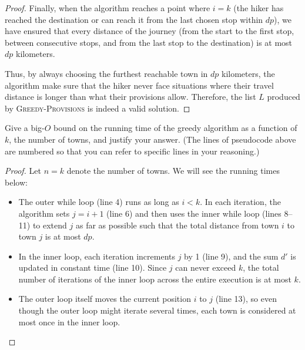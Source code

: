 \documentclass[11pt,fleqn]{exam}
\newenvironment{soln}{\color{solnblue}}{}
\newif\ifsolutions\solutionsfalse
\begin{document}
\begin{questions}
\begin{soln}
\begin{proof}
   Finally, when the algorithm reaches a point where \( i = k \) (the hiker has reached the destination 
   or can reach it from the last chosen stop within \( dp \)), we have ensured that every distance of the journey 
   (from the start to the first stop, between consecutive stops, and from the last stop to the destination) 
   is at most \( dp \) kilometers.
   
   Thus, by always choosing the furthest reachable town in \( dp \) kilometers, 
   the algorithm make sure that the hiker never face situations where their travel distance is longer than what their provisions allow. 
   Therefore, the list \( L \) produced by \textsc{Greedy-Provisions} is indeed a valid solution.
   \end{proof}
\end{soln}
   

\ifsolutions

\fi

\question[3]
Give a big-$O$ bound on the running time of the greedy algorithm as a function of $k$, the number of towns, and justify your answer. (The lines of pseudocode above are numbered so that you can refer to specific lines in your reasoning.)

\begin{soln}
   \begin{proof}
   Let \( n = k \) denote the number of towns. We will see the running times below:
   
   \begin{itemize}
       \item The outer while loop (line 4) runs as long as \( i < k \). In each 
       iteration, the algorithm sets \( j = i+1 \) (line 6) and then uses the inner while 
       loop (lines 8--11) to extend \( j \) as far as possible such that the total distance 
       from town \( i \) to town \( j \) is at most \( dp \). 
       \item In the inner loop, each iteration increments \( j \) by 1 (line 9), and the 
       sum \( d' \) is updated in constant time (line 10). Since \( j \) can never exceed \( k \), 
       the total number of iterations of the inner loop across the entire execution is at most \( k \).
       \item The outer loop itself moves the current position \( i \) to \( j \) (line 13), so even 
       though the outer loop might iterate several times, each town is considered at most once in the inner loop. 
   \end{itemize}
   

\end{proof}
\end{soln}
\end{questions}
\end{document}
